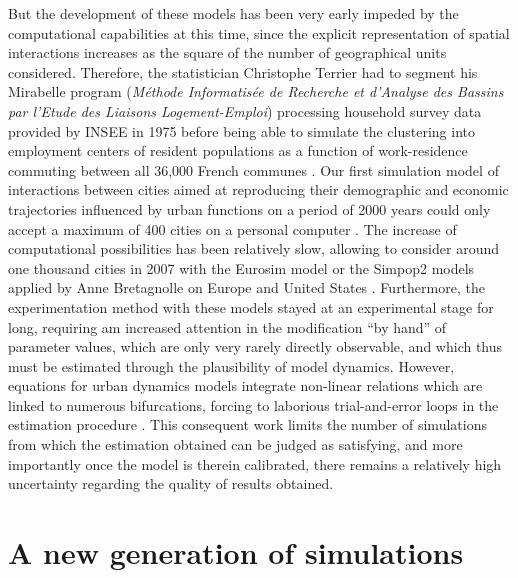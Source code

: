 \documentclass[10pt]{article}
\begin{document}
But the development of these models has been very early impeded by the computational capabilities at this time, since the explicit representation of spatial interactions increases as the square of the number of geographical units considered. Therefore, the statistician Christophe Terrier had to segment his Mirabelle program (\textit{M{\'e}thode Informatis{\'e}e de Recherche et d'Analyse des Bassins par l'Etude des Liaisons Logement-Emploi}) processing household survey data provided by INSEE in 1975 before being able to simulate the clustering into employment centers of resident populations as a function of work-residence commuting between all 36,000 French communes \citep{terrier1980mirabelle}. Our first simulation model of interactions between cities aimed at reproducing their demographic and economic trajectories influenced by urban functions on a period of 2000 years could only accept a maximum of 400 cities on a personal computer \citep{bura1996multiagent,sanders1997simpop}. The increase of computational possibilities has been relatively slow, allowing to consider around one thousand cities in 2007 with the Eurosim model \citep{sanders2007artificial} or the Simpop2 models applied by Anne Bretagnolle on Europe and United States \citep{bretagnolle2010simulating}. Furthermore, the experimentation method with these models stayed at an experimental stage for long, requiring am increased attention in the modification ``by hand'' of parameter values, which are only very rarely directly observable, and which thus must be estimated through the plausibility of model dynamics. However, equations for urban dynamics models integrate non-linear relations which are linked to numerous bifurcations, forcing to laborious trial-and-error loops in the estimation procedure \citep{sanders2007artificial}. This consequent work limits the number of simulations from which the estimation obtained can be judged as satisfying, and more importantly once the model is therein calibrated, there remains a relatively high uncertainty regarding the quality of results obtained.


\section{A new generation of simulations}
\end{document}

